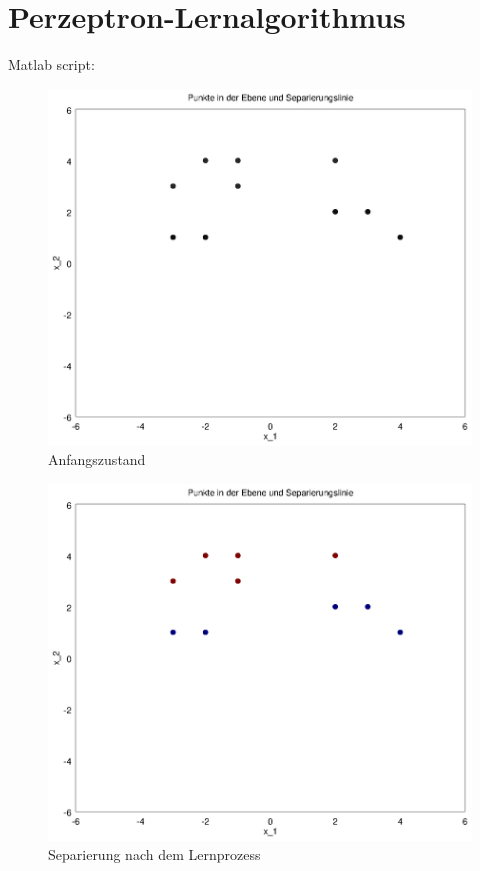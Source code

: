 \documentclass[DIN, pagenumber=false, fontsize=11pt, parskip=half]{scrartcl}
\begin{document}
    \section{Perzeptron-Lernalgorithmus}
    Matlab script:
    
    \begin{figure}[H]
        \includegraphics[width=\textwidth]{initial}
        \caption{Anfangszustand}
    \end{figure}
    \begin{figure}[H]
        \includegraphics[width=\textwidth]{separated}
        \caption{Separierung nach dem Lernprozess}
    \end{figure}
\end{document}
